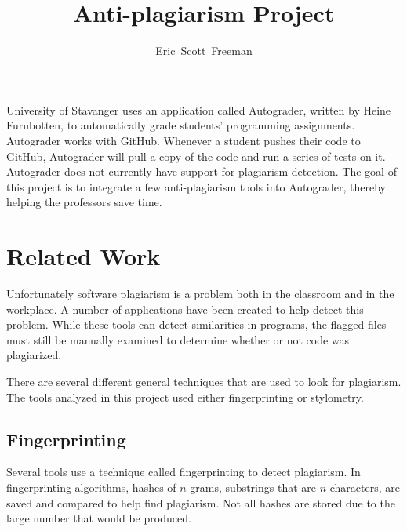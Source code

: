 \documentclass[10pt,journal,compsoc]{IEEEtran}
\begin{document}
	\title{Anti-plagiarism Project}
	\author{Eric~Scott~Freeman}


	\maketitle
	\IEEEdisplaynontitleabstractindextext
	\IEEEpeerreviewmaketitle

	
	 University of Stavanger uses an application called Autograder, written by Heine Furubotten, to automatically grade students' programming assignments. Autograder works with GitHub. Whenever a student pushes their code to GitHub, Autograder will pull a copy of the code and run a series of tests on it. Autograder does not currently have support for plagiarism detection. The goal of this project is to integrate a few anti-plagiarism tools into Autograder, thereby helping the professors save time.

	\section{Related Work}
	Unfortunately software plagiarism is a problem both in the classroom and in the workplace. A number of applications have been created to help detect this problem. While these tools can detect similarities in programs, the flagged files must still be manually examined to determine whether or not code was plagiarized.
		
	There are several different general techniques that are used to look for plagiarism. The tools analyzed in this project used either fingerprinting or stylometry.
		
		\subsection{Fingerprinting}
		Several tools use a technique called fingerprinting to detect plagiarism. In fingerprinting algorithms, hashes of $n$-grams, substrings that are $n$ characters, are saved and compared to help find plagiarism. Not all hashes are stored due to the large number that would be produced. 
		
\end{document}
